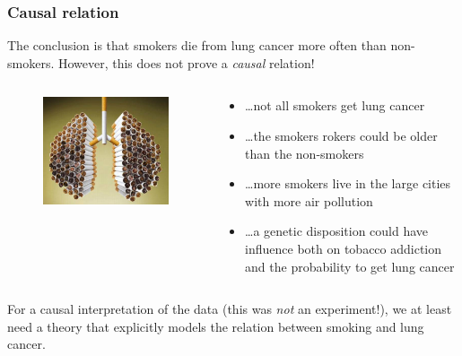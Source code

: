 \documentclass{beamer}
\begin{document}
\begin{frame}
  \frametitle{Causal relation}
  
  The conclusion is that smokers die from lung cancer more often than non-smokers. However, this does not prove a \emph{causal} relation!
\vfill  
  \begin{columns}
    \begin{column}{0.3 \textwidth}
      \begin{figure}
        \centering
          \includegraphics[width=1.00\textwidth]{img/les-6-smoking2.jpg}
      \end{figure}
    \end{column}
    \begin{column}{0.7 \textwidth}
      \begin{itemize}
        \item \dots not all smokers get lung cancer
        \item \dots the smokers rokers could be older than the non-smokers
        \item \dots more smokers live in the large cities with more air pollution
        \item \dots a genetic disposition could have influence both on tobacco addiction and the probability to get lung cancer
      \end{itemize}
    \end{column}
  \end{columns}
\vfill
  For a causal interpretation of the data (this was \emph{not} an experiment!), we at least need a theory that explicitly models the relation between smoking and lung cancer.
\end{frame}
\end{document}
